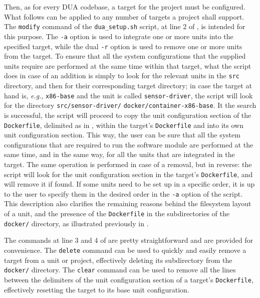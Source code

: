 Then, as for every DUA codebase, a target for the project must be configured. What follows can be applied to any number of targets a project shall support. The \texttt{modify} command of the \texttt{dua\_setup.sh} script, at line 2 of , is intended for this purpose. The \texttt{-a} option is used to integrate one or more units into the specified target, while the dual \texttt{-r} option is used to remove one or more units from the target. To ensure that all the system configurations that the supplied units require are performed at the same time within that target, what the script does in case of an addition is simply to look for the relevant units in the \texttt{src} directory, and then for their corresponding target directory; in case the target at hand is, \emph{e.g.}, \texttt{x86-base} and the unit is called \texttt{sensor-driver}, the script will look for the directory \texttt{src/sensor-driver/} \texttt{docker/container-x86-base}. It the search is successful, the script will proceed to copy the unit configuration section of the \texttt{Dockerfile}, delimited as in , within the target's \texttt{Dockerfile} and into its own unit configuration section. This way, the user can be sure that all the system configurations that are required to run the software module are performed at the same time, and in the same way, for all the units that are integrated in the target. The same operation is performed in case of a removal, but in reverse: the script will look for the unit configuration section in the target's \texttt{Dockerfile}, and will remove it if found. If some units need to be set up in a specific order, it is up to the user to specify them in the desired order in the \texttt{-a} option of the script. This description also clarifies the remaining reasons behind the filesystem layout of a unit, and the presence of the \texttt{Dockerfile} in the subdirectories of the \texttt{docker/} directory, as illustrated previously in .

The commands at line 3 and 4 of  are pretty straightforward and are provided for convenience. The \texttt{delete} command can be used to quickly and easily remove a target from a unit or project, effectively deleting its subdirectory from the \texttt{docker/} directory. The \texttt{clear} command can be used to remove all the lines between the delimiters of the unit configuration section of a target's \texttt{Dockerfile}, effectively resetting the target to its base unit configuration.

